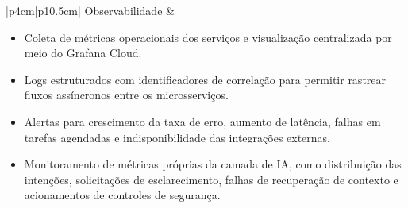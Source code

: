 {\begin{longtable}{|p{4cm}|p{10.5cm}|}
Observabilidade &
\begin{minipage}[t]{\linewidth}
\begin{itemize}[noitemsep,topsep=2pt,leftmargin=*]
    \item Coleta de métricas operacionais dos serviços e visualização centralizada por meio do Grafana Cloud.
    \item Logs estruturados com identificadores de correlação para permitir rastrear fluxos assíncronos entre os microsserviços.
    \item Alertas para crescimento da taxa de erro, aumento de latência, falhas em tarefas agendadas e indisponibilidade das integrações externas.
    \item Monitoramento de métricas próprias da camada de IA, como distribuição das intenções, solicitações de esclarecimento, falhas de recuperação de contexto e acionamentos de controles de segurança.
\end{itemize}
\end{minipage} \\ \hline

\end{longtable}
}
